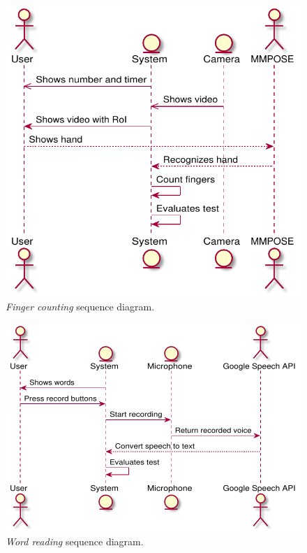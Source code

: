 \begin{figure}[h!t]
    \centering
    \includegraphics[scale=0.8]{assets/plantuml/pdf/sequence/finger.pdf}
    \caption{\emph{Finger counting} sequence diagram.}
    \label{fig:sequence:finger}
\end{figure}

\begin{figure}[h!t]
    \centering
    \includegraphics[scale=0.8]{assets/plantuml/pdf/sequence/word.pdf}
    \caption{\emph{Word reading} sequence diagram.}
    \label{fig:sequence:word}
\end{figure}